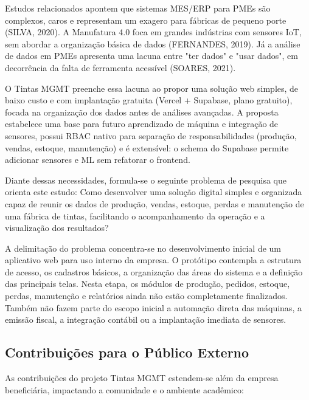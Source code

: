 \documentclass[12pt,a4paper]{article}
\begin{document}
Estudos relacionados apontem que sistemas MES/ERP para PMEs são complexos, caros e representam um exagero para fábricas de pequeno porte (SILVA, 2020). A Manufatura 4.0 foca em grandes indústrias com sensores IoT, sem abordar a organização básica de dados (FERNANDES, 2019). Já a análise de dados em PMEs apresenta uma lacuna entre "ter dados" e "usar dados", em decorrência da falta de ferramenta acessível (SOARES, 2021).

O Tintas MGMT preenche essa lacuna ao propor uma solução web simples, de baixo custo e com implantação gratuita (Vercel + Supabase, plano gratuito), focada na organização dos dados antes de análises avançadas. A proposta estabelece uma base para futuro aprendizado de máquina e integração de sensores, possui RBAC nativo para separação de responsabilidades (produção, vendas, estoque, manutenção) e é extensível: o schema do Supabase permite adicionar sensores e ML sem refatorar o frontend.

Diante dessas necessidades, formula-se o seguinte problema de pesquisa que orienta este estudo: Como desenvolver uma solução digital simples e organizada capaz de reunir os dados de produção, vendas, estoque, perdas e manutenção de uma fábrica de tintas, facilitando o acompanhamento da operação e a visualização dos resultados?

A delimitação do problema concentra-se no desenvolvimento inicial de um aplicativo web para uso interno da empresa. O protótipo contempla a estrutura de acesso, os cadastros básicos, a organização das áreas do sistema e a definição das principais telas. Nesta etapa, os módulos de produção, pedidos, estoque, perdas, manutenção e relatórios ainda não estão completamente finalizados. Também não fazem parte do escopo inicial a automação direta das máquinas, a emissão fiscal, a integração contábil ou a implantação imediata de sensores.

\subsection{Contribuições para o Público Externo}
As contribuições do projeto Tintas MGMT estendem-se além da empresa beneficiária, impactando a comunidade e o ambiente acadêmico:
\end{document}
